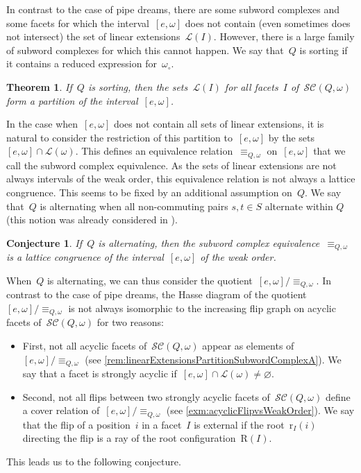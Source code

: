 \documentclass[reqno]{amsart}
\newtheorem{theoremA}{Theorem}
\newtheorem{conjectureA}{Conjecture}
\theoremstyle{definition}
\newcommand{\linearExtensions}{\mathcal{L}} %
\newcommand{\wo}{\omega_\circ} %
\newcommand{\subwordComplex}{\mathcal{SC}} %
\newcommand{\Roots}{\mathrm{R}} %
\newcommand{\rootFunction}[2]{\mathrm{r}_{#1}(#2)} %
\begin{document}
In contrast to the case of pipe dreams, there are some subword complexes and some facets for which the interval~$[e, \omega]$ does not contain (even sometimes does not intersect) the set of linear extensions~$\linearExtensions(I)$.
However, there is a large family of subword complexes for which this cannot happen.
We say that~$Q$ is sorting if it contains a reduced expression for~$\wo$.

\begin{theoremA}
\label{thm:C}
If~$Q$ is sorting, then the sets~$\linearExtensions(I)$ for all facets~$I$ of~$\subwordComplex(Q, \omega)$ form a partition of the interval~$[e, \omega]$.
\end{theoremA}

In the case when~$[e, \omega]$ does not contain all sets of linear extensions, it is natural to consider the restriction of this partition to~$[e, \omega]$ by the sets~$[e, \omega] \cap \linearExtensions(\omega)$.
This defines an equivalence relation~$\equiv_{Q, \omega}$ on~$[e, \omega]$ that we call the subword complex equivalence.
As the sets of linear extensions are not always intervals of the weak order, this equivalence relation is not always a lattice congruence.
This seems to be fixed by an additional assumption on~$Q$.
We say that~$Q$ is alternating when all non-commuting pairs $s, t\in S$ alternate within $Q$ (this notion was already considered in \cite{PilaudSantos-brickPolytope, CeballosLabbeStump}).

\begin{conjectureA}
\label{conj:A}
If~$Q$ is alternating, then the subword complex equivalence~$\equiv_{Q, \omega}$ is a lattice congruence of the interval~$[e, \omega]$ of the weak order.
\end{conjectureA}

When~$Q$ is alternating, we can thus consider the quotient~$[e, \omega]/{\equiv_{Q, \omega}}$.
In contrast to the case of pipe dreams, the Hasse diagram of the quotient~$[e, \omega]/{\equiv_{Q, \omega}}$ is not always isomorphic to the increasing flip graph on acyclic facets of~$\subwordComplex(Q, \omega)$ for two reasons:
\begin{itemize}
\item First, not all acyclic facets of~$\subwordComplex(Q, \omega)$ appear as elements of~$[e, \omega]/{\equiv_{Q, \omega}}$ (see \cref{rem:linearExtensionsPartitionSubwordComplexA}). We say that a facet is strongly acyclic if~$[e, \omega] \cap \linearExtensions(\omega) \ne \varnothing$.
\item Second, not all flips between two strongly acyclic facets of~$\subwordComplex(Q, \omega)$ define a cover relation of~$[e, \omega]/{\equiv_{Q, \omega}}$ (see \cref{exm:acyclicFlipvsWeakOrder}). We say that the flip of a position~$i$ in a facet~$I$ is external if the root~$\rootFunction{I}{i}$ directing the flip is a ray of the root configuration~$\Roots(I)$.
\end{itemize}
This leads us to the following conjecture.
\end{document}
